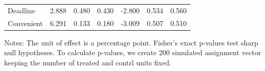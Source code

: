 \documentclass[
    a4paper
]{article}
\begin{document}
\begin{table}
\begin{threeparttable}
\begin{tabular}[t]{lcccccc}
\hspace{1em}Deadline & 2.888 & 0.480 & 0.430 & -2.800 & 0.534 & 0.560\\
\hspace{1em}Convenient & 6.291 & 0.133 & 0.180 & -3.009 & 0.507 & 0.510\\
\bottomrule
\end{tabular}
\begin{tablenotes}
\item Notes: The unit of effect is a percentage point. Fisher's exact p-values test sharp null hypotheses. To calculate p-values, we create 200 simulated assignment vector keeping the number of treated and contrl units fixed.
\end{tablenotes}
\end{threeparttable}
\end{table}
\end{document}
